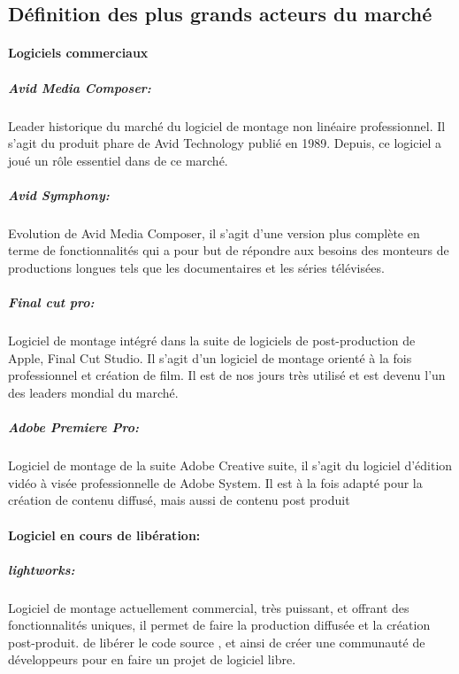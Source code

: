 \subsection{Définition des plus grands acteurs du marché}

\paragraph {Logiciels commerciaux}

\subparagraph{Avid Media Composer:}

Leader historique du marché du logiciel de montage non linéaire
professionnel. Il s'agit du produit phare de Avid Technology publié en
1989. Depuis, ce logiciel a joué un rôle essentiel dans %
de ce marché.

\subparagraph{Avid Symphony:}

Evolution de Avid Media Composer, il s'agit d'une version plus complète
en terme de fonctionnalités qui a pour but de répondre aux besoins
des monteurs de productions longues tels que les documentaires et les
séries télévisées.

\subparagraph{Final cut pro:}

Logiciel de montage intégré dans la suite de logiciels de
post-production de Apple, Final Cut Studio. Il s'agit d'un logiciel
de montage orienté à la fois professionnel et création de film. Il
est de nos jours très utilisé et est devenu l'un des leaders mondial
du marché.

\subparagraph{Adobe Premiere Pro:}

Logiciel de montage de la suite Adobe Creative suite, il s'agit du
logiciel d'édition vidéo à visée professionnelle de Adobe System. Il
est à la fois adapté pour la création de contenu diffusé, mais aussi
de contenu post produit

\paragraph {Logiciel en cours de libération:}

\subparagraph{lightworks:}

Logiciel de montage actuellement commercial, très puissant,
et offrant des fonctionnalités uniques, il permet de faire %
la production diffusée et la création post-produit. %
de libérer le code source
\cite{TheLightworksOpenSourceProjectStartHere}, et ainsi  de créer une
communauté de développeurs pour en faire un projet de logiciel libre.

